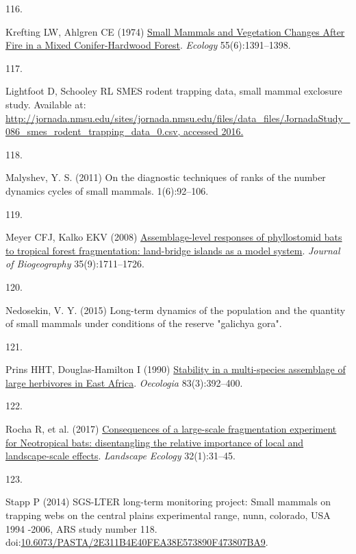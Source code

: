 \documentclass{article}
\newlength{\cslhangindent}
\newlength{\csllabelwidth}
\newlength{\cslentryspacingunit} %
\newenvironment{CSLReferences}[2] %
 {%
  \setlength{\parindent}{0pt}
  \ifodd #1
  \let\oldpar\par
  \def\par{\hangindent=\cslhangindent\oldpar}
  \fi
  \setlength{\parskip}{#2\cslentryspacingunit}
 }%
 {}
\newcommand{\CSLLeftMargin}[1]{\parbox[t]{\csllabelwidth}{#1}}
\newcommand{\CSLRightInline}[1]{\parbox[t]{\linewidth - \csllabelwidth}{#1}\break}
\begin{document}
\begin{CSLReferences}{0}{0}
\leavevmode{}%
\CSLLeftMargin{116. }%
\CSLRightInline{Krefting LW, Ahlgren CE (1974)
\href{https://doi.org/10.2307/1935467}{Small Mammals and Vegetation
Changes After Fire in a Mixed Conifer-Hardwood Forest}. \emph{Ecology}
55(6):1391--1398.}

\leavevmode{}%
\CSLLeftMargin{117. }%
\CSLRightInline{Lightfoot D, Schooley RL SMES rodent trapping data,
small mammal exclosure study. Available at:
\href{http://jornada.nmsu.edu/sites/jornada.nmsu.edu/files/data_files/JornadaStudy_086_smes_rodent_trapping_data_0.csv,\%20accessed\%202016.}{http://jornada.nmsu.edu/sites/jornada.nmsu.edu/files/data\_files/JornadaStudy\_086\_smes\_rodent\_trapping\_data\_0.csv,
accessed 2016.}}

\leavevmode{}%
\CSLLeftMargin{118. }%
\CSLRightInline{Malyshev, Y. S. (2011) On the diagnostic techniques of
ranks of the number dynamics cycles of small mammals. 1(6):92--106.}

\leavevmode{}%
\CSLLeftMargin{119. }%
\CSLRightInline{Meyer CFJ, Kalko EKV (2008)
\href{https://doi.org/10.1111/j.1365-2699.2008.01916.x}{Assemblage-level
responses of phyllostomid bats to tropical forest fragmentation:
land-bridge islands as a model system}. \emph{Journal of Biogeography}
35(9):1711--1726.}

\leavevmode{}%
\CSLLeftMargin{120. }%
\CSLRightInline{Nedosekin, V. Y. (2015) Long-term dynamics of the
population and the quantity of small mammals under conditions of the
reserve {"}galichya gora{"}.}

\leavevmode{}%
\CSLLeftMargin{121. }%
\CSLRightInline{Prins HHT, Douglas-Hamilton I (1990)
\href{https://doi.org/10.1007/BF00317566}{Stability in a multi-species
assemblage of large herbivores in East Africa}. \emph{Oecologia}
83(3):392--400.}

\leavevmode{}%
\CSLLeftMargin{122. }%
\CSLRightInline{Rocha R, et al. (2017)
\href{https://doi.org/10.1007/s10980-016-0425-3}{Consequences of a
large-scale fragmentation experiment for Neotropical bats: disentangling
the relative importance of local and landscape-scale effects}.
\emph{Landscape Ecology} 32(1):31--45.}

\leavevmode{}%
\CSLLeftMargin{123. }%
\CSLRightInline{Stapp P (2014) SGS-LTER long-term monitoring project:
Small mammals on trapping webs on the central plains experimental range,
nunn, colorado, USA 1994 -2006, ARS study number 118.
doi:\href{https://doi.org/10.6073/PASTA/2E311B4E40FEA38E573890F473807BA9}{10.6073/PASTA/2E311B4E40FEA38E573890F473807BA9}.}


\end{CSLReferences}
\end{document}
